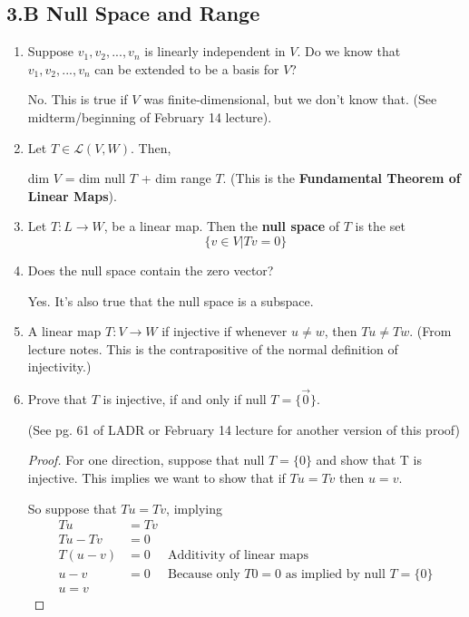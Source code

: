 \documentclass[11pt]{article}
\begin{document}
\subsection*{3.B Null Space and Range}
\begin{enumerate}
	\item Suppose $v_1, v_2, ..., v_n$ is linearly independent in $V$. Do we know that $v_1, v_2, ..., v_n$ can be extended to be a basis for $V$?
	
	\bigskip
	
	No. This is true if $V$ was finite-dimensional, but we don't know that. (See midterm/beginning of February 14 lecture).
	
	\item Let $T \in \mathcal{L}(V, W)$. Then,
	
	dim $V$ = dim null $T$ + dim range $T$. (This is the \textbf{Fundamental Theorem of Linear Maps}).
	
	\item Let $T: L \rightarrow W$, be a linear map. Then the \textbf{null space} of $T$ is the set
	\[\{v \in V | Tv = 0\}\]
	
	\item Does the null space contain the zero vector?
	
	\bigskip
	
	Yes. It's also true that the null space is a subspace.
	
	\item A linear map $T: V \rightarrow W$ if injective if whenever $u \neq w$, then $Tu \neq Tw$. (From lecture notes. This is the contrapositive of the normal definition of injectivity.)
	
	\item Prove that $T$ is injective, if and only if null $T = \{\vec{0}\}$.
	
	(See pg. 61 of LADR or February 14 lecture for another version of this proof)
		
	\begin{proof}
		For one direction, suppose that null $T = \{0\}$ and show that T is injective. This implies we want to show that if $Tu = Tv$ then $u = v$.
		
		\bigskip
		
		So suppose that $Tu = Tv$, implying
		\[\begin{aligned}
		Tu &= Tv \\
		Tu - Tv &= 0 \\
		T(u - v) &= 0 & \text{Additivity of linear maps} \\
		u - v &= 0 & \text{Because only $T0 = 0$ as implied by null $T = \{0\}$} \\
		u = v
		\end{aligned}\]
		

\end{proof}
\end{enumerate}
\end{document}
